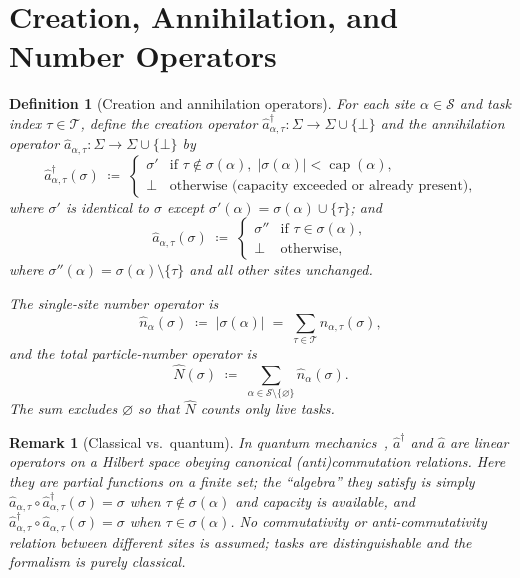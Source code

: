 \documentclass[11pt,a4paper]{article}
\newtheorem{definition}{Definition}[section]
\newtheorem{remark}{Remark}[section]
\newcommand{\cre}[1]{\hat{a}^{\dagger}_{#1}}
\newcommand{\ann}[1]{\hat{a}_{#1}}
\newcommand{\num}[1]{\hat{n}_{#1}}
\newcommand{\Num}{\hat{N}}
\begin{document}
\section{Creation, Annihilation, and Number Operators}

\begin{definition}[Creation and annihilation operators]
\label{def:cre-ann}
For each site $\alpha \in \mathcal{S}$ and task index $\tau \in
\mathcal{T}$, define the \emph{creation operator}
$\cre{\alpha,\tau} : \Sigma \to \Sigma \cup \{\bot\}$ and the
\emph{annihilation operator} $\ann{\alpha,\tau} : \Sigma \to \Sigma
\cup \{\bot\}$ by
\[
  \cre{\alpha,\tau}(\sigma) \;\coloneqq\;
  \begin{cases}
    \sigma' & \text{if } \tau \notin \sigma(\alpha),\;
              |\sigma(\alpha)| < \operatorname{cap}(\alpha),\\
    \bot & \text{otherwise (capacity exceeded or already present)},
  \end{cases}
\]
where $\sigma'$ is identical to $\sigma$ except $\sigma'(\alpha) =
\sigma(\alpha) \cup \{\tau\}$; and
\[
  \ann{\alpha,\tau}(\sigma) \;\coloneqq\;
  \begin{cases}
    \sigma'' & \text{if } \tau \in \sigma(\alpha),\\
    \bot & \text{otherwise},
  \end{cases}
\]
where $\sigma''(\alpha) = \sigma(\alpha) \setminus \{\tau\}$ and all
other sites unchanged.

The \emph{single-site number operator} is
\[
  \num{\alpha}(\sigma) \;\coloneqq\; |\sigma(\alpha)|
  \;=\; \sum_{\tau \in \mathcal{T}} n_{\alpha,\tau}(\sigma),
\]
and the \emph{total particle-number operator} is
\[
  \Num(\sigma) \;\coloneqq\;
  \sum_{\alpha \in \mathcal{S} \setminus \{\varnothing\}} \num{\alpha}(\sigma).
\]
The sum excludes $\varnothing$ so that $\Num$ counts only
\emph{live} tasks.
\end{definition}

\begin{remark}[Classical vs.\ quantum]
In quantum mechanics~\cite{landau_qm,feynman_iii}, $\hat{a}^\dagger$ and $\hat{a}$ are linear
operators on a Hilbert space obeying canonical (anti)commutation
relations.  Here they are \emph{partial functions on a finite set};
the ``algebra'' they satisfy is simply
$\ann{\alpha,\tau} \circ \cre{\alpha,\tau}(\sigma) = \sigma$ when
$\tau \notin \sigma(\alpha)$ and capacity is available, and
$\cre{\alpha,\tau} \circ \ann{\alpha,\tau}(\sigma) = \sigma$ when
$\tau \in \sigma(\alpha)$.  No commutativity or anti-commutativity
relation between different sites is assumed; tasks are
distinguishable and the formalism is purely classical.
\end{remark}
\end{document}
